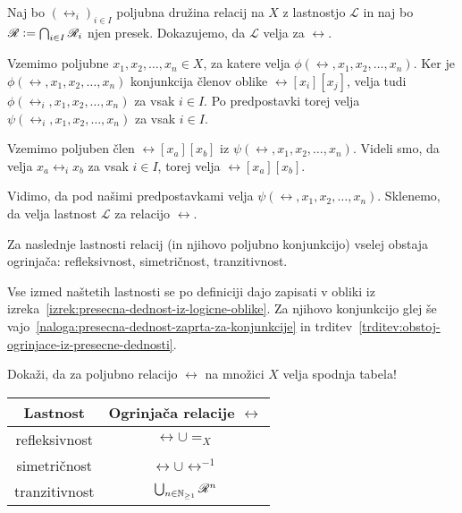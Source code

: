                 \begin{dokaz}
                        Naj bo $(\rel_i)_{i \in I}$ poljubna družina relacij na $X$ z lastnostjo $\mathscr{L}$ in naj bo $\rel \dfeq \bigcap_{i \in I} \rel_i$ njen presek. Dokazujemo, da $\mathscr{L}$ velja za $\rel$.

                        Vzemimo poljubne $x_1, x_2, \ldots, x_n \in X$, za katere velja $\phi(\rel, x_1, x_2, \ldots, x_n)$. Ker je $\phi(\rel, x_1, x_2, \ldots, x_n)$ konjunkcija členov oblike $\rel[x_i][x_j]$, velja tudi $\phi(\rel_i, x_1, x_2, \ldots, x_n)$ za vsak $i \in I$. Po predpostavki torej velja $\psi(\rel_i, x_1, x_2, \ldots, x_n)$ za vsak $i \in I$.

                        Vzemimo poljuben člen $\rel[x_a][x_b]$ iz $\psi(\rel, x_1, x_2, \ldots, x_n)$. Videli smo, da velja $x_a \mathrel{\rel_i} x_b$ za vsak $i \in I$, torej velja $\rel[x_a][x_b]$.

                        Vidimo, da pod našimi predpostavkami velja $\psi(\rel, x_1, x_2, \ldots, x_n)$. Sklenemo, da velja lastnost $\mathscr{L}$ za relacijo $\rel$.
                \end{dokaz}

                \begin{posledica}\label{posledica:obstoj-ogrinjac}
                        Za naslednje lastnosti relacij (in njihovo poljubno konjunkcijo) vselej obstaja ogrinjača: refleksivnost, simetričnost, tranzitivnost.
                \end{posledica}

                \begin{dokaz}
                        Vse izmed naštetih lastnosti se po definiciji dajo zapisati v obliki iz izreka~\ref{izrek:presecna-dednost-iz-logicne-oblike}. Za njihovo konjunkcijo glej še vajo~\ref{naloga:presecna-dednost-zaprta-za-konjunkcije} in trditev~\ref{trditev:obstoj-ogrinjace-iz-presecne-dednosti}.
                \end{dokaz}

                \begin{naloga}
                        Dokaži, da za poljubno relacijo $\rel$ na množici $X$ velja spodnja tabela!
                        \begin{center}
                                \begin{tabular}{|c|c|}
                                        \hline
                                        \textbf{Lastnost} & \textbf{Ogrinjača relacije $\rel$} \\
                                        \hline
                                        refleksivnost & $\rel \cup =_X$ \\
                                        simetričnost & $\rel \cup \rel^{-1}$ \\
                                        tranzitivnost & $\bigcup_{n \in \NN_{\geq 1}} \rel^n$ \\
                                        \hline
                                \end{tabular}
                        \end{center}
                \end{naloga}


